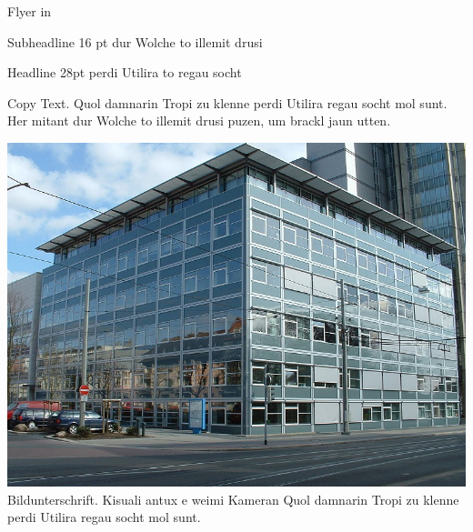 \documentclass[
notumble,%
langpaper]{tubsleaflet}
\begin{document}
\begin{gausspage}
  \showtubslogo
  \begin{segment}[bgimage=infozentrum.jpg]{3}
  \end{segment}
  \begin{segment}[c,bgcolor=tubsBlue60,fgcolor=tubsWhite]{1}
    Flyer in \tubslatex
  \end{segment}
  \begin{segment}[bgcolor=tubsBlue,fgcolor=tubsWhite]{4}
    Subheadline 16 pt dur Wolche to illemit drusi
  \end{segment}
\end{gausspage}

\begin{gausspage}
  \begin{segment}[bgcolor=tubsBlue60]{8}
    \raggedright
    Headline 28pt perdi Utilira to regau socht\bigskip
    
    Copy Text. Quol damnarin Tropi zu klenne perdi Utilira regau socht mol 
    sunt. Her mitant dur Wolche to illemit drusi puzen, um brackl jaun utten. 
    
    \includegraphics[width=\textwidth]{infozentrum}
     Bildunterschrift. Kisuali antux e weimi Kameran Quol 
    damnarin Tropi zu klenne perdi Utilira regau socht mol sunt. 
  \end{segment}
\end{gausspage}
\end{document}
